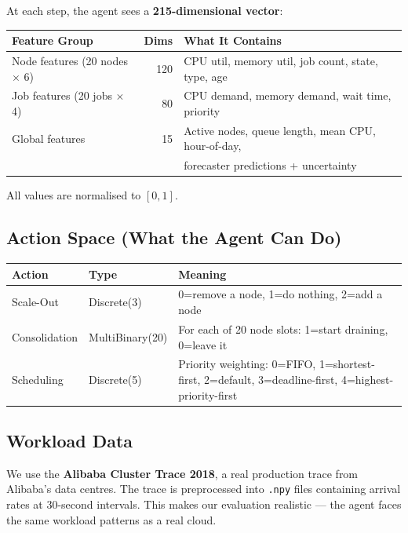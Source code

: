 \documentclass[11pt,a4paper]{article}
\begin{document}
At each step, the agent sees a \textbf{215-dimensional vector}:

\begin{center}
\begin{tabular}{lrl}
\toprule
\textbf{Feature Group} & \textbf{Dims} & \textbf{What It Contains} \\
\midrule
Node features (20 nodes $\times$ 6) & 120 &
  CPU util, memory util, job count, state, type, age \\
Job features (20 jobs $\times$ 4) & 80 &
  CPU demand, memory demand, wait time, priority \\
Global features & 15 &
  Active nodes, queue length, mean CPU, hour-of-day, \\
  & & forecaster predictions + uncertainty \\
\bottomrule
\end{tabular}
\end{center}

All values are normalised to $[0, 1]$.

\subsection{Action Space (What the Agent Can Do)}

\begin{center}
\begin{tabular}{llp{7cm}}
\toprule
\textbf{Action} & \textbf{Type} & \textbf{Meaning} \\
\midrule
Scale-Out & Discrete(3) & 0=remove a node, 1=do nothing, 2=add a node \\
Consolidation & MultiBinary(20) & For each of 20 node slots: 1=start draining, 0=leave it \\
Scheduling & Discrete(5) & Priority weighting: 0=FIFO, 1=shortest-first, 2=default, 3=deadline-first, 4=highest-priority-first \\
\bottomrule
\end{tabular}
\end{center}

\subsection{Workload Data}

We use the \textbf{Alibaba Cluster Trace 2018}, a real production trace from
Alibaba's data centres. The trace is preprocessed into \texttt{.npy} files
containing arrival rates at 30-second intervals. This makes our evaluation
realistic --- the agent faces the same workload patterns as a real cloud.
\end{document}
